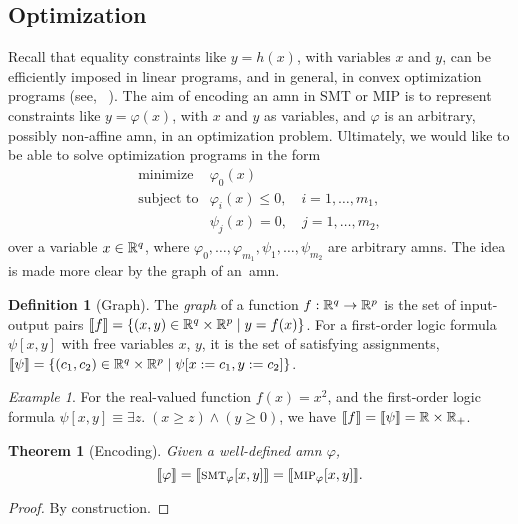 \documentclass[10pt]{article}
\newcommand{\amn}{\varphi}
\newcommand{\Graph}[1]{\llbracket #1 \rrbracket}
\newcommand{\smt}{\mbox{\sc smt}}
\newcommand{\mip}{\mbox{\sc mip}}
\theoremstyle{remark}
\newtheorem{example}{Example}
\theoremstyle{definition}
\newtheorem{definition}{Definition}
\theoremstyle{plain}
\newtheorem{theorem}{Theorem}
\begin{document}
\subsection{Optimization}
Recall that equality constraints like $y=h(x)$, with variables $x$ and $y$, can
be efficiently imposed in linear programs, and in general, in convex
optimization programs (see, \eg~\cite{Boyd:2004}).
The aim of encoding an \acs{amn} in SMT or MIP is to
represent constraints like $y = \amn(x)$, with $x$ and $y$ as variables, and
$\amn$ is an arbitrary, possibly non-affine \acs{amn}, in an optimization problem. 
Ultimately, we would like to be able to solve optimization programs in the form
\begin{equation}
	\label{eq:optimization}
	\begin{array}{ll}
		\mbox{minimize}   & \amn_0(x) \\
		\mbox{subject to} 
			& \amn_i(x) \leq 0, \quad i=1,\ldots,m_1, \\
			& \psi_j(x) = 0, \quad j=1,\ldots,m_2,
	\end{array}
\end{equation}
over a variable $x\in\mathbb{R}^q$,
where $\amn_0,\ldots,\amn_{m_1},\psi_1,\ldots,\psi_{m_2}$ are arbitrary
\acsp{amn}. The idea is made more clear by the graph of an~\acs{amn}.

\begin{definition}[Graph]
The \emph{graph} of a function $f:\mathbb{R}^q\to\mathbb{R}^p$ is the set of
input-output pairs $\Graph{f}=\{(x,y)\in\reals^q\times\reals^p\mid y=f(x)\}$.
For a first-order logic formula $\psi[x,y]$ with free variables $x$, $y$, it is
the set of satisfying assignments, $\Graph{\psi} =
\{(c_1,c_2)\in\reals^q\times\reals^p\mid\psi[x:=c_1,y:=c_2]\}$.
\end{definition}

\begin{example}
For the real-valued function $f(x) = x^2$, and the first-order logic
formula 
$\psi[x,y]\equiv\exists z .\; (x\geq z) \wedge (y \geq 0)$,
we have
$\Graph{f} = \Graph{\psi} = \reals\times\reals_+$.
\end{example}

\begin{theorem}[Encoding]\label{thm:encoding}
Given a well-defined \acs{amn} $\amn$,
\[
\Graph{\amn} = \Graph{\smt_\amn[x,y]} = \Graph{\mip_\amn[x,y]}.
\]
\end{theorem}
\begin{proof}
By construction.
\end{proof}
\end{document}
